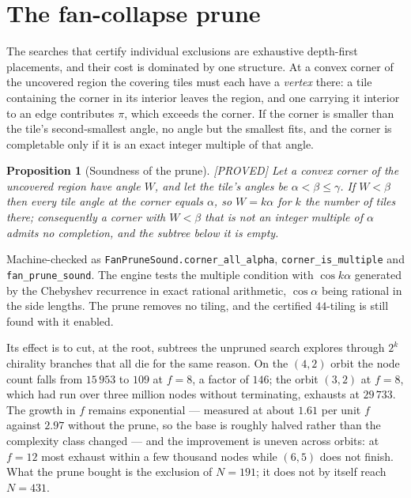 \documentclass[11pt,reqno]{amsart}
\theoremstyle{plain}
\newtheorem{proposition}[theorem]{Proposition}
\theoremstyle{definition}
\newcommand{\lab}[1]{\hfill\textnormal{\footnotesize\textsc{[#1]}}}
\begin{document}
\section{The fan-collapse prune}\label{sec:fanprune}

The searches that certify individual exclusions are exhaustive depth-first placements, and their
cost is dominated by one structure. At a convex corner of the uncovered region the covering tiles
must each have a \emph{vertex} there: a tile containing the corner in its interior leaves the
region, and one carrying it interior to an edge contributes $\pi$, which exceeds the corner. If the
corner is smaller than the tile's second-smallest angle, no angle but the smallest fits, and the
corner is completable only if it is an exact integer multiple of that angle.

\begin{proposition}[Soundness of the prune]\label{prop:fanprune}\lab{PROVED}
Let a convex corner of the uncovered region have angle $W$, and let the tile's angles be
$\alpha<\beta\le\gamma$. If $W<\beta$ then every tile angle at the corner equals $\alpha$, so
$W=k\alpha$ for $k$ the number of tiles there; consequently a corner with $W<\beta$ that is not an
integer multiple of $\alpha$ admits no completion, and the subtree below it is empty.
\end{proposition}

Machine-checked as \texttt{FanPruneSound.corner\_all\_alpha},
\texttt{corner\_is\_multiple} and \texttt{fan\_prune\_sound}. The engine tests the multiple
condition with $\cos k\alpha$ generated by the Chebyshev recurrence in exact rational arithmetic,
$\cos\alpha$ being rational in the side lengths. The prune removes no tiling, and the certified
$44$-tiling is still found with it enabled.

Its effect is to cut, at the root, subtrees the unpruned search explores through $2^{k}$ chirality
branches that all die for the same reason. On the $(4,2)$ orbit the node count falls from
$15\,953$ to $109$ at $f=8$, a factor of $146$; the orbit $(3,2)$ at $f=8$, which
had run over three million nodes without terminating, exhausts at $29\,733$. The growth in $f$
remains exponential --- measured at about $1.61$ per unit $f$ against $2.97$ without the prune, so
the base is roughly halved rather than the complexity class changed --- and the improvement is
uneven across orbits: at $f=12$ most exhaust within a few thousand nodes while $(6,5)$ does not
finish. What the prune bought is the exclusion of $N=191$; it does not by itself reach $N=431$.
\end{document}
